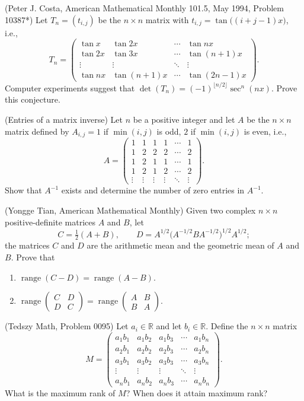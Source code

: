 \documentclass[12pt]{article}
\begin{document}
\begin{problems}
\item (Peter J. Costa, American Mathematical Monthly 101.5, May 1994, Problem 10387*) Let $T_n=(t_{i,j})$ be the $n\times n$ matrix with $t_{i,j}=\tan\big((i+j-1)x\big)$, i.e.,
\[
T_n = \begin{pmatrix}
\tan x & \tan 2x & \cdots & \tan nx\\
\tan 2x & \tan 3x & \cdots & \tan(n+1)x\\
\vdots & \vdots & \ddots & \vdots\\
\tan nx & \tan(n+1)x & \cdots & \tan(2n-1)x
\end{pmatrix}.
\]
Computer experiments suggest that $\det(T_n) = (-1)^{\lfloor n/2\rfloor}\sec^n(nx)$. Prove this conjecture.

\item (Entries of a matrix inverse) Let $n$ be a positive integer and let $A$ be the $n\times n$ matrix defined by $A_{i,j}=1$ if $\min(i,j)$ is odd, $2$ if $\min(i,j)$ is even, i.e.,
\[
A = \begin{pmatrix}
1 & 1 & 1 & 1 & \cdots & 1\\
1 & 2 & 2 & 2 & \cdots & 2\\
1 & 2 & 1 & 1 & \cdots & 1\\
1 & 2 & 1 & 2 & \cdots & 2\\
\vdots & \vdots & \vdots & \vdots & \ddots & \vdots
\end{pmatrix}.
\]
Show that $A^{-1}$ exists and determine the number of zero entries in $A^{-1}$.

\item (Yongge Tian, American Mathematical Monthly) Given two complex $n\times n$ positive-definite matrices $A$ and $B$, let
\[
C=\tfrac12(A+B), \qquad D = A^{1/2}\big(A^{-1/2}BA^{-1/2}\big)^{1/2}A^{1/2};
\]
the matrices $C$ and $D$ are the arithmetic mean and the geometric mean of $A$ and $B$. Prove that
\begin{enumerate}[label=(\alph*)]
\item $\operatorname{range}(C-D) = \operatorname{range}(A-B)$.
\item $\operatorname{range}\begin{pmatrix}C & D\\ D & C\end{pmatrix} = \operatorname{range}\begin{pmatrix}A & B\\ B & A\end{pmatrix}$.
\end{enumerate}

\item (Tedszy Math, Problem 0095) Let $a_i\in\mathbb{R}$ and let $b_i\in\mathbb{R}$. Define the $n\times n$ matrix
\[
M = \begin{pmatrix}
a_1b_1 & a_1b_2 & a_1b_3 & \cdots & a_1b_n\\
a_2b_1 & a_2b_2 & a_2b_3 & \cdots & a_2b_n\\
a_3b_1 & a_3b_2 & a_3b_3 & \cdots & a_3b_n\\
\vdots & \vdots & \vdots & \ddots & \vdots\\
a_nb_1 & a_nb_2 & a_nb_3 & \cdots & a_nb_n
\end{pmatrix}.
\]
What is the maximum rank of $M$? When does it attain maximum rank?


\end{problems}
\end{document}

